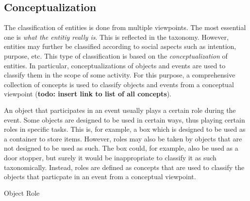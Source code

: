 \subsection{Conceptualization}
\label{sec:classification}

The classification of entities is done from multiple viewpoints.
The most essential one is \emph{what the entitiy really is}.
This is reflected in the taxonomy.
However, entities may further be classified according to social aspects such as intention, purpose, etc.
This type of classification is based on the \emph{conceptualization} of entities.
In particular, conceptualizations of objects and events are used to classify them in the scope of some activity.
For this purpose,
a comprehensive collection of concepts is used to classify objects and events from a conceptual viewpoint (\textbf{todo: insert link to list of all concepts}).

An object that participates in an event usually plays a certain role during the event.
Some objects are designed to be used in certain ways, thus playing certain roles in specific tasks.
This is, for example, a box which is designed to be used as a container to store items.
However, roles may also be taken by objects that are not designed to be used as such.
The box could, for example, also be used as a door stopper, but surely it would be
inappropriate to classify it as such taxonomically.
Instead, roles are defined as concepts that are used to classify the objects that particpate in an event from a conceptual viewpoint.

\begin{ODP}{Object Role}
\end{ODP}

